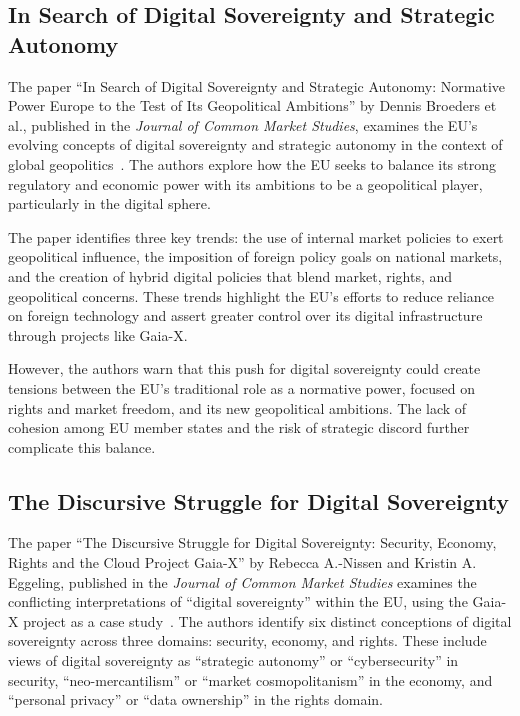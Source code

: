 \subsection{In Search of Digital Sovereignty and Strategic Autonomy}\label{subsec:in-search-of-digital-sovereignty-and-strategic-autonomy}

The paper ``In Search of Digital Sovereignty and Strategic Autonomy: Normative Power Europe to the Test of Its Geopolitical Ambitions'' by Dennis Broeders et al., published in the \textit{Journal of Common Market Studies}, examines the EU's evolving concepts of digital sovereignty and strategic autonomy in the context of global geopolitics~\cite{digital_sovereignty_and_strategic_autonomy}.
The authors explore how the EU seeks to balance its strong regulatory and economic power with its ambitions to be a geopolitical player, particularly in the digital sphere.

The paper identifies three key trends: the use of internal market policies to exert geopolitical influence, the imposition of foreign policy goals on national markets, and the creation of hybrid digital policies that blend market, rights, and geopolitical concerns.
These trends highlight the EU's efforts to reduce reliance on foreign technology and assert greater control over its digital infrastructure through projects like Gaia-X.

However, the authors warn that this push for digital sovereignty could create tensions between the EU's traditional role as a normative power, focused on rights and market freedom, and its new geopolitical ambitions.
The lack of cohesion among EU member states and the risk of strategic discord further complicate this balance.

\subsection{The Discursive Struggle for Digital Sovereignty}\label{subsec:the-discursive-struggle-for-digital-sovereignty}

The paper ``The Discursive Struggle for Digital Sovereignty: Security, Economy, Rights and the Cloud Project Gaia-X'' by Rebecca A.-Nissen and Kristin A. Eggeling, published in the \textit{Journal of Common Market Studies} examines the conflicting interpretations of ``digital sovereignty'' within the EU, using the Gaia-X project as a case study~\cite{discursive_struggle_for_digital_sovereignty}.
The authors identify six distinct conceptions of digital sovereignty across three domains: security, economy, and rights.
These include views of digital sovereignty as ``strategic autonomy'' or ``cybersecurity'' in security, ``neo-mercantilism'' or ``market cosmopolitanism'' in the economy, and ``personal privacy'' or ``data ownership'' in the rights domain.

